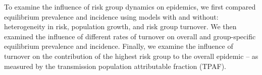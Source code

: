 To examine the influence of risk group dynamics on epidemics, we first
compared equilibrium prevalence and incidence using models with and without:
heterogeneity in risk,
population growth, and
risk group turnover.
We then examined the influence of different rates of turnover on
overall and group-specific equilibrium prevalence and incidence.
Finally, we examine the influence of turnover on the contribution of the
highest risk group to the overall epidemic -- as measured by the
transmission population attributable fraction (TPAF).
